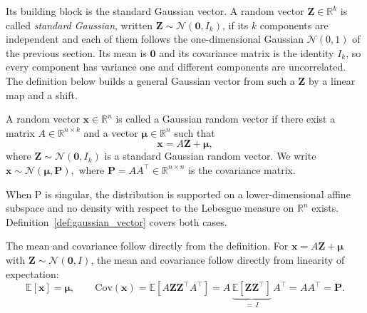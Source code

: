 Its building block is the standard Gaussian vector. A random vector $\mathbf{Z} \in \mathbb{R}^k$ is called \emph{standard Gaussian}, written $\mathbf{Z} \sim \mathcal{N}(\mathbf{0}, I_k)$, if its $k$ components are independent and each of them follows the one-dimensional Gaussian $\mathcal{N}(0,1)$ of the previous section. Its mean is $\mathbf{0}$ and its covariance matrix is the identity $I_k$, so every component has variance one and different components are uncorrelated. The definition below builds a general Gaussian vector from such a $\mathbf{Z}$ by a linear map and a shift.

\begin{definition} \label{def:gaussian_vector} 
A random vector $\mathbf{x} \in \mathbb{R}^n$ is called a Gaussian random vector if there exist a matrix $A \in \mathbb{R}^{n \times k}$ and a vector $\boldsymbol{\mu} \in \mathbb{R}^n$ such that 
\[
\mathbf{x} = A\mathbf{Z} + \boldsymbol{\mu},
\]
where $\mathbf{Z} \sim \mathcal{N}(\mathbf{0}, I_k)$ is a standard Gaussian random vector. We write $\mathbf{x} \sim \mathcal{N}(\boldsymbol{\mu},\mathbf{P}),$ where $\mathbf{P} = AA^\top \in \mathbb{R}^{n \times n}$ is the covariance matrix. 
\end{definition} 
When P is singular, the distribution is supported on a lower-dimensional affine subspace and no density with respect to the Lebesgue measure on $\mathbb{R}^n$ exists. Definition~\ref{def:gaussian_vector} covers both cases. 

\begin{remark}\label{rem:mean_cov}
The mean and covariance follow directly from the definition. For $\mathbf{x} = A\mathbf{Z} + \boldsymbol{\mu}$ with $\mathbf{Z} \sim \mathcal{N}(\mathbf{0}, I)$, the mean and covariance follow directly from linearity of expectation:
\[
  \mathbb{E}[\mathbf{x}] = \boldsymbol{\mu}, \qquad
  \mathrm{Cov}(\mathbf{x})
  = \mathbb{E}\!\left[A\mathbf{Z}\mathbf{Z}^\top A^\top\right]
  = A\,\underbrace{\mathbb{E}[\mathbf{Z}\mathbf{Z}^\top]}_{=\,I}\,A^\top
  = AA^\top = \mathbf{P}.
\]
\end{remark}

